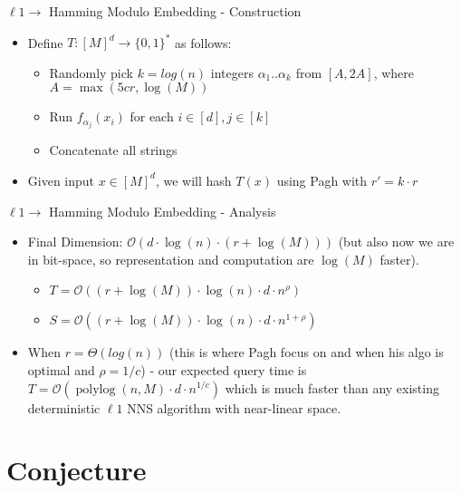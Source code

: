 \documentclass[xcolor=svgnames]{beamer}
\newcommand{\zo}{\{0,1\}}
\newcommand{\BO}{{\mathcal{O}}}
\newcommand{\polylog}{\mathop\mathrm{polylog}\nolimits}
\begin{document}
\begin{frame}{$\ell1 \rightarrow $ Hamming Modulo Embedding - Construction }
\begin{itemize}
\item Define $T : [M]^d \rightarrow \zo^*$ as follows:
\begin{itemize}
\item Randomly pick $k=log(n)$ integers $\alpha_1..\alpha_k$ from $[A, 2A]$, where $A=\max(5cr,\log(M))$
\item Run $f_{\alpha_j}(x_i)$ for each $i \in [d], j \in [k]$
\item Concatenate all strings
\end{itemize}
\item Given input $x \in [M]^d$, we will hash $T(x)$ using Pagh with $r'=k \cdot r$
\end{itemize} 
\end{frame}

\begin{frame}{$\ell1 \rightarrow $ Hamming Modulo Embedding - Analysis }
\begin{itemize}
\item Final Dimension: $\BO(d \cdot \log(n) \cdot (r +\log(M)))$ (but also now we are in bit-space, so representation and computation are $\log(M)$ faster).
\begin{itemize}
\item $T = \BO((r + \log(M)) \cdot \log(n) \cdot d \cdot n^\rho)$ 
\item $S = \BO((r + \log(M)) \cdot \log(n) \cdot d \cdot n^{1+\rho})$ 
\end{itemize} 
\item When $r=\Theta(log(n))$ (this is where Pagh focus on and when his algo is optimal and $\rho=1/c$) - our expected query time is $T = \BO(\polylog(n,M) \cdot d \cdot n^{1/c})$ which is much faster than any existing deterministic $\ell1$ NNS algorithm with near-linear space.
\end{itemize} 
\end{frame}


\section{Conjecture}
\end{document}
